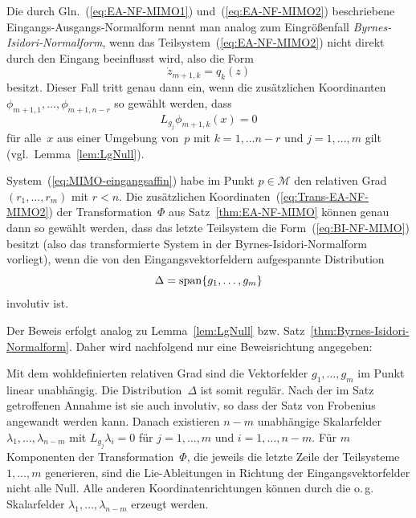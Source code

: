 Die durch Gln.~(\ref{eq:EA-NF-MIMO1}) und~(\ref{eq:EA-NF-MIMO2})
beschriebene Eingangs-Ausgangs-Normalform nennt man analog zum Eingrößenfall
\emph{Byrnes-Isidori-Normalform},
wenn das Teil\-system~(\ref{eq:EA-NF-MIMO2}) nicht direkt durch
den Eingang beeinflusst wird, also die Form
\begin{equation}
\dot{z}_{m+1,k}=q_{k}(z)\label{eq:BI-NF-MIMO}
\end{equation}
besitzt. Dieser Fall tritt genau dann ein, wenn die zusätzlichen Koordinanten
$\phi_{m+1,1},\ldots,\phi_{m+1,n-r}$ so gewählt werden, dass 
\[
L_{g_{j}}\phi_{m+1,k}(x)=0
\]
für alle~$x$ aus einer Umgebung von~$p$ mit $k=1,\ldots n-r$
und $j=1,\ldots,m$ gilt (vgl.~Lemma~\ref{lem:LgNull}).
\begin{theorem}
System~(\ref{eq:MIMO-eingangsaffin}) habe im Punkt $p\in\mathcal{M}$
den relativen Grad $(r_{1},\ldots,r_{m})$ mit $r<n$. Die zusätzlichen
Koordinaten~(\ref{eq:Trans-EA-NF-MIMO2}) der Transformation~$\Phi$
aus Satz~\ref{thm:EA-NF-MIMO} können genau dann so gewählt werden,
dass das letzte Teilsystem die Form~(\ref{eq:BI-NF-MIMO}) besitzt
(also das transformierte System in der Byrnes-Isidori-Normalform vorliegt),
wenn die von den Eingangsvektorfeldern aufgespannte Distribution
\begin{equation}
\Delta={\operatorname{span}}\{g_{1},\ldots,g_{m}\}\label{eq:Distr-Eingangs-VF-MIMO}
\end{equation}
involutiv ist.
\end{theorem}
Der Beweis erfolgt analog zu Lemma~\ref{lem:LgNull} bzw. Satz~\ref{thm:Byrnes-Isidori-Normalform}.
Daher wird nachfolgend nur eine Beweisrichtung angegeben:

\begin{proofsketch}Mit dem wohldefinierten relativen Grad sind die
Vektorfelder $g_{1},\ldots,g_{m}$ im Punkt linear unabhängig. Die
Distribution~$\Delta$ ist somit regulär. Nach der im Satz getroffenen
Annahme ist sie auch involutiv, so dass der Satz von Frobenius angewandt
werden kann. Danach existieren $n-m$ unabhängige Skalarfelder $\lambda_{1},\ldots,\lambda_{n-m}$
mit $L_{g_{j}}\lambda_{i}=0$ für $j=1,\ldots,m$ und $i=1,\ldots,n-m$.
Für $m$ Komponenten der Transformation~$\Phi$, die jeweils die
letzte Zeile der Teilsysteme $1,\ldots,m$ generieren, sind die Lie-Ableitungen
in Richtung der Eingangsvektorfelder nicht alle Null. Alle anderen
Koordinatenrichtungen können durch die o.\,g. Skalarfelder $\lambda_{1},\ldots,\lambda_{n-m}$
erzeugt werden.\end{proofsketch}

